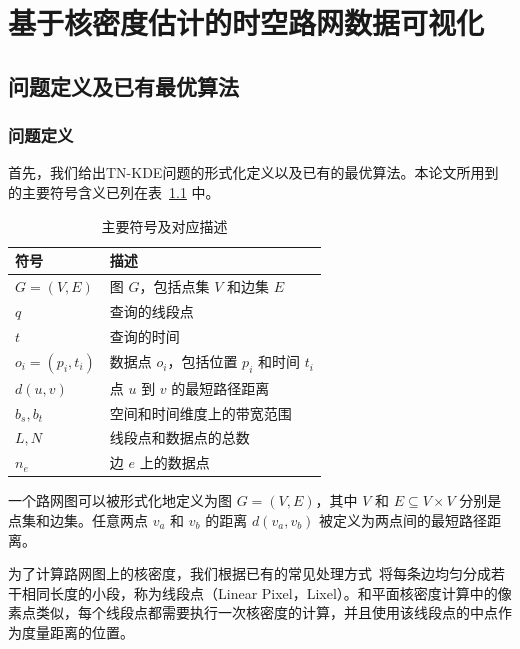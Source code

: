 \chapter{基于核密度估计的时空路网数据可视化}

\section{问题定义及已有最优算法}
\label{sec3:preliminaries}

\subsection{问题定义}

首先，我们给出TN-KDE问题的形式化定义以及已有的最优算法。本论文所用到的主要符号含义已列在表~\ref{tab:symbols} 中。

\begin{table}[h]
	\centering
	\def\arraystretch{1.5}
	\caption{主要符号及对应描述}
	\label{tab:symbols}
	\begin{tabular}{l|l}
	\hline
	符号  & 描述 \\ \hline\hline
	$G=(V,E)$      & 图 $G$，包括点集 $V$ 和边集 $E$ \\
	$q$	     	   & 查询的线段点 \\
	$t$		       & 查询的时间 \\
	$o_i = (p_i, t_i)$ & 数据点 $o_i$，包括位置 $p_i$ 和时间 $t_i$ \\
	$d(u, v)$      & 点 $u$ 到 $v$ 的最短路径距离 \\
	$b_s, b_t$     & 空间和时间维度上的带宽范围 \\
	$L, N$		   & 线段点和数据点的总数 \\
	$n_e$          & 边 $e$ 上的数据点 \\
	\hline
	\end{tabular}
\end{table}

\begin{definition}[路网图]
一个路网图可以被形式化地定义为图 $G = (V, E)$，其中 $V$ 和 $E \subseteq V \times V$ 分别是点集和边集。任意两点 $v_a$ 和 $v_b$ 的距离 $d(v_a, v_b)$ 被定义为两点间的最短路径距离。
\end{definition}

为了计算路网图上的核密度，我们根据已有的常见处理方式~\cite{xie_kernel_2008, chan_fast_2021}将每条边均匀分成若干相同长度的小段，称为线段点（Linear Pixel，Lixel）。和平面核密度计算中的像素点类似，每个线段点都需要执行一次核密度的计算，并且使用该线段点的中点作为度量距离的位置。


